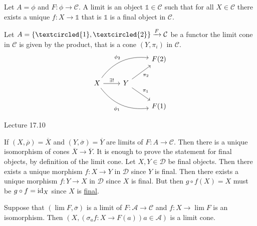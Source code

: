 \begin{exmp}
    Let $A=\phi$ and $F\colon \phi \to \mathcal{C}$. 
    A limit is an object $\mathds{1} \in \mathcal{C}$ such that for all $X \in \mathcal{C}$ there exists a unique $f \colon X \to \mathds{1}$ that is $\mathds{1}$ is a final object in $\mathcal{C}$.
\end{exmp}

\begin{exmp}
    Let $A = \{ \textcircled{1} , \textcircled{2} \} \xrightarrow{F} \mathcal{C}$ be a functor the limit cone in $\mathcal{C}$ is given by the product, that is a cone $(Y, \pi_i)$ in $\mathcal{C}$.
    \[
    \begin{tikzcd}
        &
        &
        F(2)
        \\
        X
        \arrow[rru, bend left, "\phi_2"]
        \arrow[rrd, bend right, "\phi_1"']
        \arrow[r, "\exists !"]
        &
        Y
        \arrow[ru, "\pi_2"']
        \arrow[rd, "\pi_1"]
        &
        \\
        &
        &
        F(1)
    \end{tikzcd}
    \]
\end{exmp}

Lecture 17.10

If $(X , \overline{\rho}) = \overline{X}$ and $(Y , \overline{\sigma})=\overline{Y}$ are limits of $F \colon A \to \mathcal{C}$.
Then there is a unique isomorphism of cones $\overline{X} \to \overline{Y}$.
It is enough to prove the statement for final objects, by definition of the limit cone.
Let $X,Y \in \mathcal{D}$ be final objects.
Then there exists a unique morphism $f \colon X \to Y$ in $\mathcal{D}$ since $Y$ is final.
Then there exists a unique morphism $f \colon Y \to X$ in $\mathcal{D}$ since $X$ is final.
But then $g \circ f (X) = X$ must be $g \circ f = \operatorname{id}_X$ since $X$ is \underline{final}.

\begin{prop}
    Suppose that $(\lim F , \overline{\sigma} )$ is a limit of $F \colon \mathcal{A} \to \mathcal{C}$ and $f \colon X \to \lim F$ is an isomorphism.
    Then $(X ,(\sigma_a f\colon X \to F(a)) a \in \mathcal{A})$ is a limit cone.
\end{prop}

